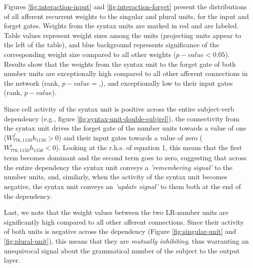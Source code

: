 Figures \ref{fig:interaction-input} and \ref{fig:interaction-forget} present the distributions of all afferent recurrent weights to the singular and plural units, for the input and forget gates. Weights from the syntax units are marked in red and are labeled. Table values represent weight sizes among the units (projecting units appear to the left of the table), and blue background represents significance of the corresponding weight size compared to all other weights ($p-value<0.05$). Results show that the weights from the syntax unit to the forget gate of both number units are exceptionally high compared to all other afferent connections in the network (rank, $p-value=$,), and exceptionally low to their input gates (rank, $p-value$). 

Since cell activity of the syntax unit is positive across the entire subject-verb dependency (e.g., figure \ref{fig:syntax-unit-double-subjrel}), the connectivity from the syntax unit drives the forget gate of the number units towards a value of one ($W^f_{776, 1150}h_{1150}>0$) and their input gates towards a value of zero ($W^i_{776, 1150}h_{1150}<0$). Looking at the r.h.s. of equation 1, this means that the first term becomes dominant and the second term goes to zero, suggesting that across the entire dependency the syntax unit conveys a \textit{'remembering signal'} to the number units, and, similarly, when the activity of the syntax unit becomes negative, the syntax unit conveys an \textit{'update signal'} to them both at the end of the dependency. 

Last, we note that the weight values between the two LR-number units are significantly high compared to all other afferent connections. Since their activity of both units is negative across the dependency (Figure \ref{fig:singular-unit} and \ref{fig:plural-unit}), this means that they are \textit{mutually inhibiting}, thus warranting an unequivocal signal about the grammatical number of the subject to the output layer.

